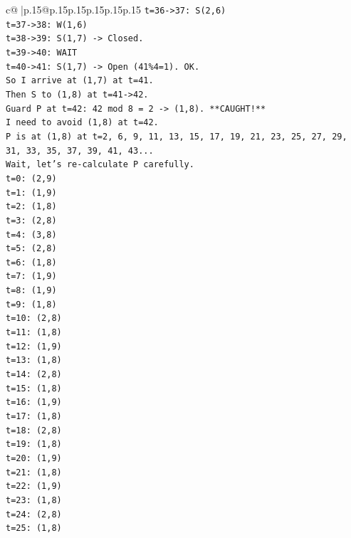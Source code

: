 \documentclass{article}
\begin{document}
{\begin{supertabular}{c@{$\;$}|p{.15\linewidth}@{}p{.15\linewidth}p{.15\linewidth}p{.15\linewidth}p{.15\linewidth}p{.15\linewidth}}
{{{\texttt{t=36{-}>37: S(2,6)} \\
\texttt{t=37{-}>38: W(1,6)} \\
\texttt{t=38{-}>39: S(1,7) {-}> Closed.} \\
\texttt{t=39{-}>40: WAIT} \\
\texttt{t=40{-}>41: S(1,7) {-}> Open (41\%4=1). OK.} \\
\texttt{So I arrive at (1,7) at t=41.} \\
\texttt{Then S to (1,8) at t=41{-}>42.} \\
\texttt{Guard P at t=42: 42 mod 8 = 2 {-}> (1,8). **CAUGHT!**} \\
\texttt{I need to avoid (1,8) at t=42.} \\
\texttt{P is at (1,8) at t=2, 6, 9, 11, 13, 15, 17, 19, 21, 23, 25, 27, 29, 31, 33, 35, 37, 39, 41, 43...} \\
\texttt{Wait, let's re{-}calculate P carefully.} \\
\texttt{t=0: (2,9)} \\
\texttt{t=1: (1,9)} \\
\texttt{t=2: (1,8)} \\
\texttt{t=3: (2,8)} \\
\texttt{t=4: (3,8)} \\
\texttt{t=5: (2,8)} \\
\texttt{t=6: (1,8)} \\
\texttt{t=7: (1,9)} \\
\texttt{t=8: (1,9)} \\
\texttt{t=9: (1,8)} \\
\texttt{t=10: (2,8)} \\
\texttt{t=11: (1,8)} \\
\texttt{t=12: (1,9)} \\
\texttt{t=13: (1,8)} \\
\texttt{t=14: (2,8)} \\
\texttt{t=15: (1,8)} \\
\texttt{t=16: (1,9)} \\
\texttt{t=17: (1,8)} \\
\texttt{t=18: (2,8)} \\
\texttt{t=19: (1,8)} \\
\texttt{t=20: (1,9)} \\
\texttt{t=21: (1,8)} \\
\texttt{t=22: (1,9)} \\
\texttt{t=23: (1,8)} \\
\texttt{t=24: (2,8)} \\
\texttt{t=25: (1,8)} \\
}}}
\end{supertabular}}
\end{document}
